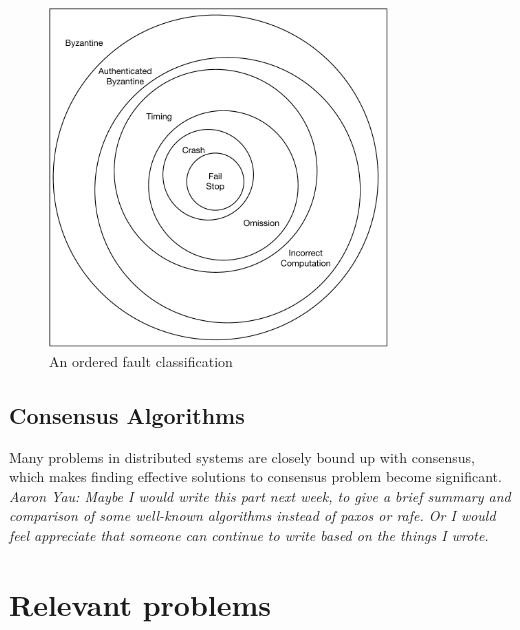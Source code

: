 \documentclass[12pt, a4paper]{article}
\begin{document}
\begin{figure}[htp]
\centering
\includegraphics[width=0.8\textwidth]{img/AOFC.pdf}
\caption{An ordered fault classification}
\label{fig:aofc}
\end{figure}

\subsection{Consensus Algorithms}
Many problems in distributed systems are closely bound up with consensus, which makes finding effective solutions to consensus problem become significant. 
\\
\textit{Aaron Yau: Maybe I would write this part next week, to give a brief summary and comparison of some well-known algorithms instead of paxos or rafe. Or I would feel appreciate that someone can continue to write based on the things I wrote.}




\section{Relevant problems}
\end{document}
